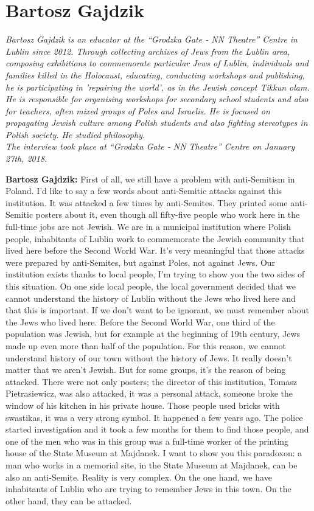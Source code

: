 \section{Bartosz Gajdzik}

\textit{Bartosz Gajdzik is an educator at the ``Grodzka Gate ‐ NN Theatre'' Centre in Lublin since 2012. Through collecting archives of Jews from the Lublin area, composing exhibitions to commemorate particular Jews of Lublin, individuals and families killed in the Holocaust, educating, conducting workshops and publishing, he is participating in 'repairing the world', as in the Jewish concept \textit{Tikkun olam}. He is responsible for organising workshops for secondary school students and also for teachers, often mixed groups of Poles and Israelis. He is focused on propagating Jewish culture among Polish students and also fighting stereotypes in Polish society. He studied philosophy.\\
The interview took place at ``Grodzka Gate ‐ NN Theatre'' Centre on January 27th, 2018.}\par
\vspace*{2em}
\textbf{Bartosz Gajdzik:} First of all, we still have a problem with anti-Semitism in Poland. I’d like to say a few words about anti-Semitic attacks against this institution. It was attacked a few times by anti-Semites. They printed some anti-Semitic posters about it, even though all fifty-five people who work here in the full-time jobs are not Jewish. We are in a municipal institution where Polish people, inhabitants of Lublin work to commemorate the Jewish community that lived here before the Second World War. It’s very meaningful that those attacks were prepared by anti-Semites, but against Poles, not against Jews. Our institution exists thanks to local people, I’m trying to show you the two sides of this situation. On one side local people, the local government decided that we cannot understand the history of Lublin without the Jews who lived here and that this is important. If we don’t want to be ignorant, we must remember about the Jews who lived here. Before the Second World War, one third of the population was Jewish, but for example at the beginning of 19th century, Jews made up even more than half of the population. For this reason, we cannot understand history of our town without the history of Jews. It really doesn’t matter that we aren’t Jewish. But for some groups, it’s the reason of being attacked. There were not only posters; the director of this institution, Tomasz Pietrasiewicz, was also attacked, it was a personal attack, someone broke the window of his kitchen in his private house. Those people used bricks with swastikas, it was a very strong symbol. It happened a few years ago. The police started investigation and it took a few months for them to find those people, and one of the men who was in this group was a full-time worker of the printing house of the State Museum at Majdanek. I want to show you this paradoxon: a man who works in a memorial site, in the State Museum at Majdanek, can be also an anti-Semite. Reality is very complex. On the one hand, we have inhabitants of Lublin who are trying to remember Jews in this town. On the other hand, they can be attacked.  
